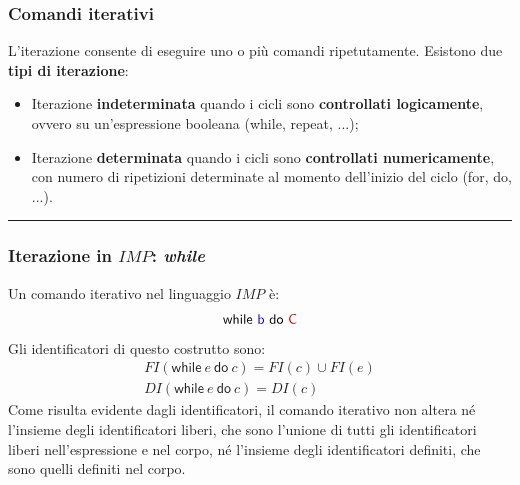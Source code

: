 \documentclass[a4paper]{article}
\newcommand{\longline}{\noindent\rule{\textwidth}{0.4pt}}
\begin{document}
 	\subsubsection{Comandi iterativi}
 	
 	L'iterazione consente di eseguire uno o più comandi ripetutamente. Esistono due \textbf{tipi di iterazione}:
 	\begin{itemize}
 		\item Iterazione \textcolor{Red3}{\textbf{indeterminata}} quando i cicli sono \textbf{controllati logicamente}, ovvero su un'espressione booleana (\textsf{while}, \textsf{repeat}, ...);
 		
 		\item Iterazione \textcolor{Red3}{\textbf{determinata}} quando i cicli sono \textbf{controllati numericamente}, con numero di ripetizioni determinate al momento dell'inizio del ciclo (\textsf{for}, \textsf{do}, ...).
 	\end{itemize}
 	
 	\longline
 	
 	\subsubsection{Iterazione in $IMP$: \emph{while}}
 	
 	Un comando iterativo nel linguaggio $IMP$ è:
 	\begin{equation*}
 		\textsf{while \textcolor{Blue3}{b} do \textcolor{Red3}{C}}
 	\end{equation*}
 	Gli identificatori di questo costrutto sono:
 	\begin{gather*}
 		FI\left(\mathsf{while} \: e \: \mathsf{do} \: c\right) = FI\left(c\right) \cup FI\left(e\right) \\
 		DI\left(\mathsf{while} \: e \: \mathsf{do} \: c\right) = DI\left(c\right)
 	\end{gather*}
 	Come risulta evidente dagli identificatori, il comando iterativo non altera né l'insieme degli identificatori liberi, che sono l'unione di tutti gli identificatori liberi nell'espressione e nel corpo, né l'insieme degli identificatori definiti, che sono quelli definiti nel corpo.\newline
 	
\end{document}
